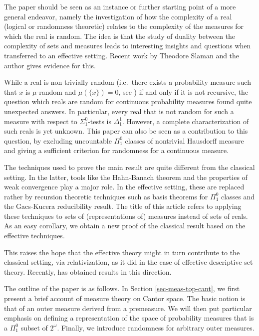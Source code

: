 \documentclass[11pt,reqno]{article}
\theoremstyle{plain}
\theoremstyle{definition}
\theoremstyle{remark}
\numberwithin{equation}{section}
\newcommand{\Cant}{\ensuremath{2^{\omega}}}
\begin{document}
The paper should be seen as an instance or further starting point of a more general endeavor, namely the investigation of how the complexity of a real (logical or randomness theoretic) relates to the complexity of the measures for which the real is random. The idea is that the study of duality between the complexity of sets and measures leads to interesting insights and questions when transferred to an effective setting. Recent work by Theodore Slaman and the author \citep{reimann-slaman:tbs,reimann-slaman:ip2} gives evidence for this.

While a real is non-trivially random (i.e.\ there exists a probability measure such that $x$ is $\mu$-random and $\mu(\{x\}) = 0$, see \citep{reimann-slaman:tbs}) if and only if it is not recursive, the question which reals are random for continuous probability measures found quite unexpected answers. In particular, every real that is not random for such a measure with respect to $\Sigma^0_1$-tests is $\Delta^1_1$. However, a complete characterization of such reals is yet unknown. 
This paper can also be seen as a contribution to this question, by excluding uncountable $\Pi^0_1$ classes of nontrivial Hausdorff measure and giving a sufficient criterion for randomness for a continuous measure.

\medskip
The techniques used to prove the main result are quite different from the classical setting. In the latter, tools like the Hahn-Banach theorem and the properties of weak convergence play a major role. In the effective setting, these are replaced rather by recursion theoretic techniques such as basis theorems for $\Pi^0_1$ classes and the Gacs-Kucera reducibility result.
The title of this article refers to applying these techniques to sets of (representations of) measures instead of sets of reals. As an easy corollary, we obtain a new proof of the classical result based on the effective techniques.

This raises the hope that the effective theory might in turn contribute to the classical setting, via relativization, as it did in the case of effective descriptive set theory. Recently, \citet{kjoshanssen:ip, kjoshanssen:ip2} has obtained results in this direction.


The outline of the paper is as follows. In Section \ref{sec-meas-top-cant}, we first present a brief account of measure theory on Cantor space. The basic notion is that of an outer measure derived from a premeasure. We will then put particular emphasis on defining a representation of the space of probability measures that is a $\Pi^0_1$ subset of $\Cant$. Finally, we introduce randomness for arbitrary outer measures.
\end{document}
